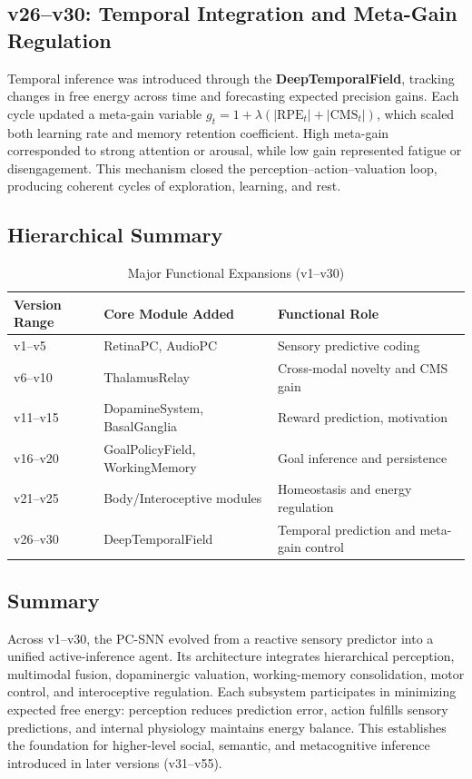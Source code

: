 \documentclass[9pt]{elife}
\begin{document}
\subsection{v26–v30: Temporal Integration and Meta-Gain Regulation}

Temporal inference was introduced through the \textbf{DeepTemporalField},
tracking changes in free energy across time and forecasting expected precision gains.
Each cycle updated a meta-gain variable
$g_t = 1 + \lambda(|\mathrm{RPE}_t| + |\mathrm{CMS}_t|)$,
which scaled both learning rate and memory retention coefficient.
High meta-gain corresponded to strong attention or arousal,
while low gain represented fatigue or disengagement.
This mechanism closed the perception–action–valuation loop,
producing coherent cycles of exploration, learning, and rest.

\subsection{Hierarchical Summary}

\begin{table}[h]
\centering
\caption{Major Functional Expansions (v1–v30)}
\begin{tabular}{l l l}
\hline
Version Range & Core Module Added & Functional Role \\
\hline
v1–v5 & RetinaPC, AudioPC & Sensory predictive coding \\
v6–v10 & ThalamusRelay & Cross-modal novelty and CMS gain \\
v11–v15 & DopamineSystem, BasalGanglia & Reward prediction, motivation \\
v16–v20 & GoalPolicyField, WorkingMemory & Goal inference and persistence \\
v21–v25 & Body/Interoceptive modules & Homeostasis and energy regulation \\
v26–v30 & DeepTemporalField & Temporal prediction and meta-gain control \\
\hline
\end{tabular}
\end{table}

\subsection{Summary}

Across v1–v30, the PC-SNN evolved from a reactive sensory predictor
into a unified active-inference agent.
Its architecture integrates hierarchical perception, multimodal fusion,
dopaminergic valuation, working-memory consolidation,
motor control, and interoceptive regulation.
Each subsystem participates in minimizing expected free energy:
perception reduces prediction error,
action fulfills sensory predictions,
and internal physiology maintains energy balance.
This establishes the foundation for higher-level social,
semantic, and metacognitive inference introduced in later versions (v31–v55).
\end{document}
